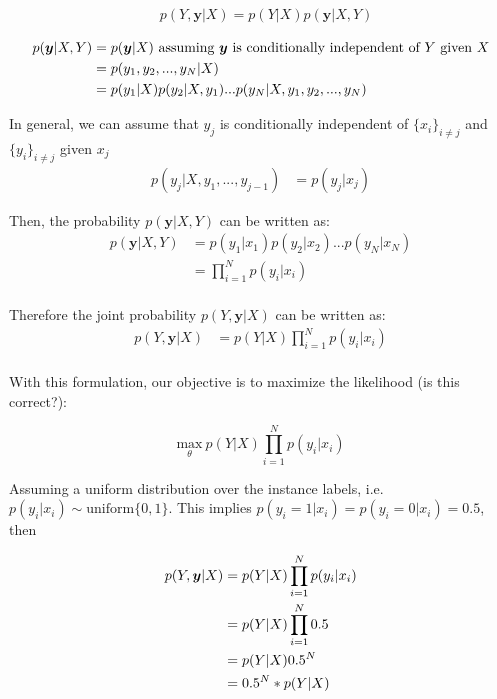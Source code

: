 \documentclass[11pt]{article}
\begin{document}
\begin{align*}
    &p(Y,\bm{y}\vert X) = p(Y\vert X)p(\bm{y}\vert X,Y)
\end{align*}


\begin{align*}
    p(\bm{y}\vert X,Y) &= p(\bm{y}\vert X)  \text{ assuming $\bm{y}$ is conditionally independent of $Y$ given $X$}\\
    &= p(y_1, y_2,...,y_N \vert X) \\
    &=p(y_1\vert X)p(y_2\vert X, y_1)...p(y_N\vert X, y_1, y_2,...,y_N) \notag
\end{align*}



In general, we can assume that $y_j$ is conditionally independent of $\{x_i\}_{i\neq j}$ and $\{y_i\}_{i\neq j}$ given $x_j$
\begin{align*}
    p(y_j\vert X, y_1,...,y_{j-1}) &= p(y_j\vert x_j)
\end{align*}

Then, the probability $p(\bm{y}\vert X,Y)$ can be written as:
\begin{align*}
    p(\bm{y}\vert X,Y) &= p(y_1\vert x_1)p(y_2\vert x_2)...p(y_N\vert x_N)\\
    &= \prod_{i=1}^{N} p(y_i\vert x_i)\\
\end{align*}

Therefore the joint probability $p(Y,\bm{y}\vert X)$ can be written as:
\begin{align*}
    p(Y,\bm{y}\vert X) &= p(Y\vert X)\prod_{i=1}^{N} p(y_i\vert x_i)\\
\end{align*}

With this formulation, our objective is to maximize the likelihood (is this correct?):

$$\underset{\theta}{\text{max}} \ p(Y\vert X)\prod_{i=1}^{N} p(y_i\vert x_i)$$

Assuming a uniform distribution over the instance labels, i.e. $p(y_i \vert x_i) \sim \text{uniform}\{0,1\}$. This implies $p(y_i=1 \vert x_i) = p(y_i=0 \vert x_i) = 0.5$, then

\begin{align}
    p(Y,\bm{y}\vert X) &= p(Y\vert X)\prod_{i=1}^{N} p(y_i\vert x_i) \label{eq:joint} \\
    &= p(Y\vert X)\prod_{i=1}^{N} 0.5 \notag \\
    &= p(Y\vert X)0.5^N \notag \\
    &= 0.5^N * p(Y\vert X) \notag
\end{align}
\end{document}

